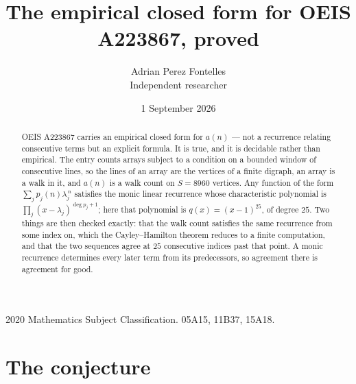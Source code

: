 \documentclass[11pt,a4paper]{article}
\title{The empirical closed form for OEIS A223867, proved}
\author{Adrian Perez Fontelles\\ \small Independent researcher}
\date{1 September 2026}
\theoremstyle{plain}
\theoremstyle{definition}
\begin{document}
\maketitle

\begin{abstract}
OEIS A223867 carries an empirical closed form for $a(n)$ --- not a recurrence relating
consecutive terms but an explicit formula. It is true, and it is decidable rather than
empirical. The entry counts arrays subject to a condition on a bounded window of consecutive lines, so the lines of an array are the
vertices of a finite digraph, an array is a walk in it, and $a(n)$ is a walk count on
$S=8960$ vertices. Any function of the form $\sum_j p_j(n)\lambda_j^{\,n}$ satisfies the
monic linear recurrence whose characteristic polynomial is
$\prod_j(x-\lambda_j)^{\deg p_j+1}$; here that polynomial is $q(x)=(x-1)^{25}$, of degree
$25$. Two things are then checked exactly: that the walk count satisfies the same
recurrence from some index on, which the Cayley--Hamilton theorem reduces to a finite
computation, and that the two sequences agree at $25$ consecutive indices past that
point. A monic recurrence determines every later term from its predecessors, so agreement
there is agreement for good.
\end{abstract}

\noindent\small 2020 Mathematics Subject Classification. 05A15, 11B37, 15A18.\normalsize

\section{The conjecture}
\end{document}
